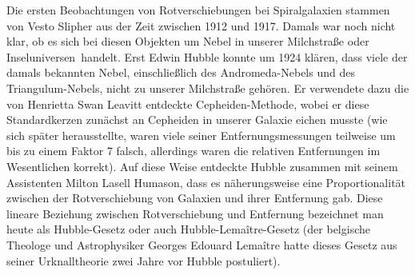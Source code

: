 Die ersten Beobachtungen von Rotverschiebungen bei Spiralgalaxien stammen von 
Vesto Slipher aus der Zeit zwischen 1912 und 1917. 
Damals war noch nicht klar, ob es sich bei diesen Objekten um Nebel in unserer Milchstra\ss e oder
\glqq Inseluniversen\grqq\ handelt.
Erst Edwin Hubble 
konnte um 1924 kl\"aren, dass viele der damals bekannten Nebel, einschlie\ss lich
des Andromeda-Nebels und des Triangulum-Nebels, nicht zu unserer Milchstra\ss e geh\"oren. Er verwendete
dazu die von Henrietta Swan Leavitt entdeckte Cepheiden-Methode, wobei er diese Standardkerzen zun\"achst
an Cepheiden in unserer Galaxie eichen musste (wie sich sp\"ater herausstellte, waren viele seiner
Entfernungsmessungen teilweise um bis zu einem Faktor 7 falsch, allerdings waren die relativen Entfernungen
im Wesentlichen korrekt).  Auf diese Weise entdeckte Hubble zusammen mit seinem Assistenten 
Milton Lasell Humason, dass es n\"aherungsweise eine Proportionalit\"at zwischen der Rotverschiebung
von Galaxien und ihrer Entfernung gab. Diese lineare Beziehung zwischen Rotverschiebung und
Entfernung bezeichnet man heute als Hubble-Gesetz
oder auch Hubble-Lema\^{i}tre-Gesetz (der belgische Theologe und Astrophysiker 
Georges Edouard Lema\^{i}tre
hatte dieses Gesetz aus seiner Urknalltheorie zwei Jahre vor Hubble postuliert). 

